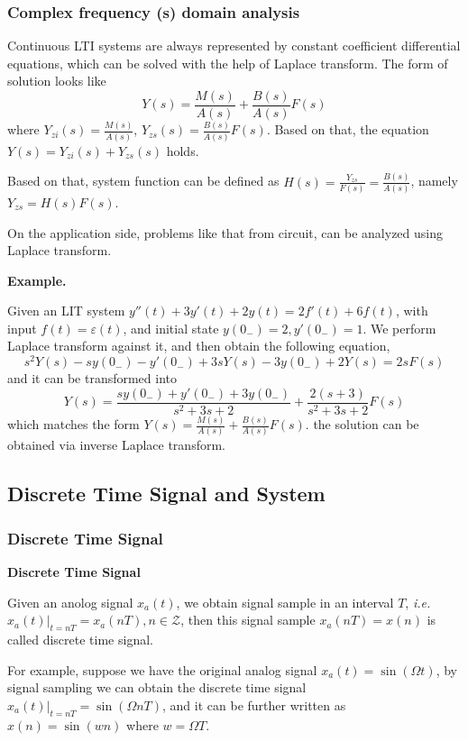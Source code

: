  \subsubsection{Complex frequency (s) domain analysis}

 Continuous LTI systems are always represented by constant coefficient differential equations,
 which can be solved with the help of Laplace transform. The form of solution looks like
 \[ Y(s) = \frac{M(s)}{A(s)} + \frac{B(s)}{A(s)} F(s)\]
 where $Y_{zi}(s) = \frac{M(s)}{A(s)}$, $Y_{zs}(s) = \frac{B(s)}{A(s)}F(s)$.
 Based on that, the equation $Y(s) = Y_{zi}(s) + Y_{zs}(s)$ holds.

 Based on that, system function can be defined as $H(s) = \frac{Y_{zs}}{F(s)} = \frac{B(s)}{A(s)}$,
 namely $Y_{zs} = H(s)F(s)$.

 On the application side, problems like that from circuit, can be analyzed using Laplace transform.

 {\bf Example.}

 Given an LIT system $y''(t) + 3y'(t) + 2y(t) = 2f'(t) + 6f(t)$, with input
 $f(t) = \varepsilon(t)$, and initial state $y(0_-)=2, y'(0_-)=1$.
 We perform Laplace transform against it, and then obtain the following equation,
 \[ s^2Y(s) -sy(0_-) - y'(0_-) + 3sY(s) - 3y(0_-) + 2Y(s) = 2sF(s)\]
 and it can be transformed into
 \[ Y(s) = \frac{sy(0_-) + y'(0_-) + 3y(0_-)}{s^2 + 3s + 2}
	 +\frac{2(s+3)}{s^2 + 3s + 2} F(s) \]
 which matches the form $ Y(s) = \frac{M(s)}{A(s)} + \frac{B(s)}{A(s)} F(s)$.
 the solution can be obtained via inverse Laplace transform.

\subsection{Discrete Time Signal and System}

\subsubsection{Discrete Time Signal}

{\bf Discrete Time Signal}

Given an anolog signal $x_a(t)$, we obtain signal sample
in an interval $T$, \emph{i.e.} $x_a(t)|_{t=nT} = x_a(nT), n \in \mathcal{Z}$,
then this signal sample $x_a(nT) = x(n)$ is called discrete time signal.

For example, suppose we have the original analog signal $x_a(t) = \sin(\Omega t)$,
by signal sampling we can obtain the discrete time signal $x_a(t)|_{t=nT} = \sin(\Omega nT)$,
and it can be further written as $x(n) = \sin(wn)$ where $w = \Omega T$.

